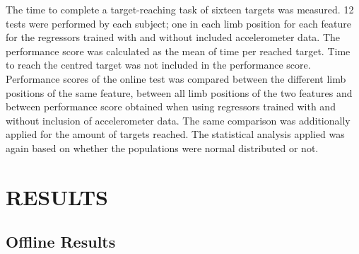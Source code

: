 \begin{multicols}{2}
The time to complete a target-reaching task of sixteen targets was measured. 12 tests were performed by each subject; one in each limb position for each feature for the regressors trained with and without included accelerometer data. The performance score was calculated as the mean of time per reached target. Time to reach the centred target was not included in the performance score. Performance scores of the online test was compared between the different limb positions of the same feature, between all limb positions of the two features and between performance score obtained when using regressors trained with and without inclusion of accelerometer data. The same comparison was additionally applied for the amount of targets reached. The statistical analysis applied was again based on whether the populations were normal distributed or not. 

\newpage
\clearpage
\end{multicols}

\section*{RESULTS}%

\subsection*{Offline Results}


